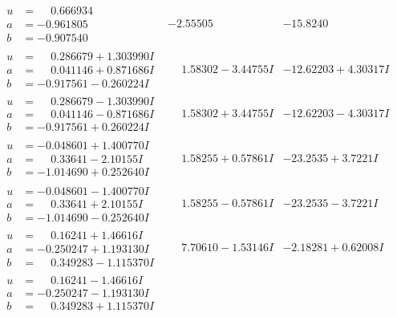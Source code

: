 \documentclass[1p]{elsarticle_modified}
\theoremstyle{definition}
\begin{document}
$$\begin{array}{c|c|c}
\begin{aligned}
u &= \phantom{-}0.666934\phantom{ +0.000000I} \\
a &= -0.961805\phantom{ +0.000000I} \\
b &= -0.907540\phantom{ +0.000000I}\end{aligned}
 & -2.55505\phantom{ +0.000000I} & -15.8240\phantom{ +0.000000I} \\ \hline\begin{aligned}
u &= \phantom{-}0.286679 + 1.303990 I \\
a &= \phantom{-}0.041146 + 0.871686 I \\
b &= -0.917561 - 0.260224 I\end{aligned}
 & \phantom{-}1.58302 - 3.44755 I & -12.62203 + 4.30317 I \\ \hline\begin{aligned}
u &= \phantom{-}0.286679 - 1.303990 I \\
a &= \phantom{-}0.041146 - 0.871686 I \\
b &= -0.917561 + 0.260224 I\end{aligned}
 & \phantom{-}1.58302 + 3.44755 I & -12.62203 - 4.30317 I \\ \hline\begin{aligned}
u &= -0.048601 + 1.400770 I \\
a &= \phantom{-}0.33641 - 2.10155 I \\
b &= -1.014690 + 0.252640 I\end{aligned}
 & \phantom{-}1.58255 + 0.57861 I & -23.2535 + 3.7221 I \\ \hline\begin{aligned}
u &= -0.048601 - 1.400770 I \\
a &= \phantom{-}0.33641 + 2.10155 I \\
b &= -1.014690 - 0.252640 I\end{aligned}
 & \phantom{-}1.58255 - 0.57861 I & -23.2535 - 3.7221 I \\ \hline\begin{aligned}
u &= \phantom{-}0.16241 + 1.46616 I \\
a &= -0.250247 + 1.193130 I \\
b &= \phantom{-}0.349283 - 1.115370 I\end{aligned}
 & \phantom{-}7.70610 - 1.53146 I & -2.18281 + 0.62008 I \\ \hline\begin{aligned}
u &= \phantom{-}0.16241 - 1.46616 I \\
a &= -0.250247 - 1.193130 I \\
b &= \phantom{-}0.349283 + 1.115370 I\end{aligned}

\end{array}$$
\end{document}
